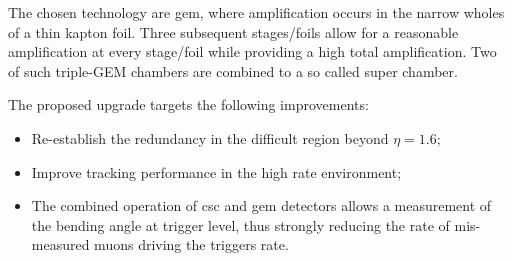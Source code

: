 The chosen technology are {gem}, where amplification occurs in the narrow wholes of a thin kapton foil. Three subsequent stages/foils allow for a reasonable amplification at every stage/foil while providing a high total amplification. Two of such triple-GEM chambers are combined to a so called super chamber.

The proposed upgrade targets the following improvements:
	\begin{itemize}
		\item Re-establish the redundancy in the difficult region beyond $\eta = 1.6 $;
		\item Improve tracking performance in the high rate environment;
		\item The combined operation of {csc} and {gem} detectors allows a measurement of the bending angle at trigger level, thus strongly reducing the rate of mis-measured muons driving the triggers rate.

	\end{itemize}

